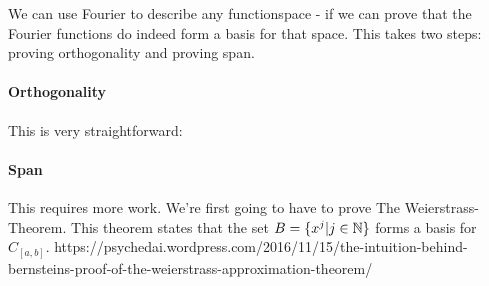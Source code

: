 We can use Fourier to describe any functionspace - if we can prove that the Fourier functions do indeed form a basis for that space. This takes two steps: proving orthogonality and proving span.

\paragraph{Orthogonality} This is very straightforward: 

\paragraph{Span} This  requires more work.  We're first going to have to prove The Weierstrass-Theorem. This theorem states that the set $B = \{ x^j | j \in \mathbb{N} \}$ forms a basis for $C_{[a,b]}$.
https://psychedai.wordpress.com/2016/11/15/the-intuition-behind-bernsteins-proof-of-the-weierstrass-approximation-theorem/



